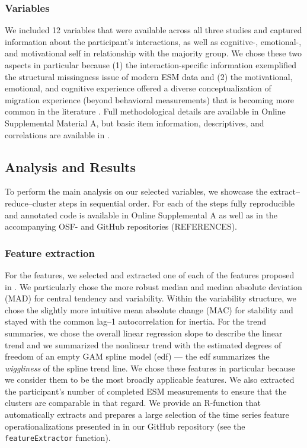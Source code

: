 \subsubsection{Variables}

We included 12 variables that were available across all three studies
and captured information about the participant's interactions, as well
as cognitive-, emotional-, and motivational self in relationship with
the majority group. We chose these two aspects in particular because (1)
the interaction-specific information exemplified the structural
missingness issue of modern ESM data and (2) the motivational,
emotional, and cognitive experience offered a diverse conceptualization
of migration experience (beyond behavioral measurements) that is
becoming more common in the literature \citep[][]{Kreienkamp2022d}. Full
methodological details are available in Online Supplemental Material A,
but basic item information, descriptives, and correlations are available
in .

\subsection{Analysis and Results}

To perform the main analysis on our selected variables, we showcase the
extract--reduce--cluster steps in sequential order. For each of the
steps fully reproducible and annotated code is available in Online
Supplemental A as well as in the accompanying OSF- and GitHub
repositories (REFERENCES).

\subsubsection{Feature extraction}

For the features, we selected and extracted one of each of the features
proposed in . We particularly chose the more
robust median and median absolute deviation (MAD) for central tendency
and variability. Within the variability structure, we chose the slightly
more intuitive mean absolute change (MAC) for stability and stayed with
the common lag--1 autocorrelation for inertia. For the trend summaries,
we chose the overall linear regression slope to describe the linear
trend and we summarized the nonlinear trend with the estimated degrees
of freedom of an empty GAM spline model (edf) --- the edf summarizes the
\textit{wiggliness} of the spline trend line. We chose these features in
particular because we consider them to be the most broadly applicable
features. We also extracted the participant's number of completed ESM
measurements to ensure that the clusters are comparable in that regard.
We provide an R-function that automatically extracts and prepares a
large selection of the time series feature operationalizations presented
in  in our GitHub repository (see the
\texttt{featureExtractor} function).

